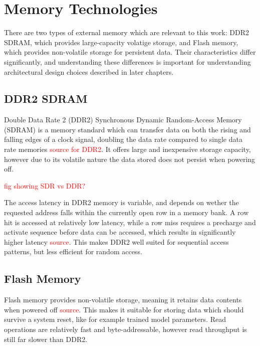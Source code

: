 \section{Memory Technologies}
\label{sec:memory_technologies}

There are two types of external memory which are relevant to this work: DDR2 SDRAM, which provides large-capacity volatige storage, and Flash memory, which provides non-volatile storage for persistent data. Their characteristics differ significantly, and understanding these differences is important for understanding architectural design choices described in later chapters.

\subsection{DDR2 SDRAM}
\label{sec:ddr2}

Double Data Rate 2 (DDR2) Synchronous Dynamic Random-Access Memory (SDRAM) is a memory standard which can transfer data on both the rising and falling edges of a clock signal, doubling the data rate compared to single data rate memories \textcolor{red}{source for DDR2}. It offers large and inexpensive storage capacity, however due to its volatile nature the data stored does not persist when powering off.

\textcolor{red}{fig showing SDR vs DDR?}

The access latency in DDR2 memory is variable, and depends on wether the requested address falls within the currently open row in a memory bank. A row hit is accessed at relatively low latency, while a row miss requires a precharge and activate sequence before data can be accessed, which results in significantly higher latency \textcolor{red}{source}. This makes DDR2 well suited for sequential access patterns, but less efficient for random access.

\subsection{Flash Memory}
\label{sec:flash}

Flash memory provides non-volatile storage, meaning it retains data contents when powered off \textcolor{red}{source}. This makes it suitable for storing data which should survive a system reset, like for example trained model parameters.  Read operations are relatively fast and byte-addressable, however read throughput is still far slower than DDR2. 


